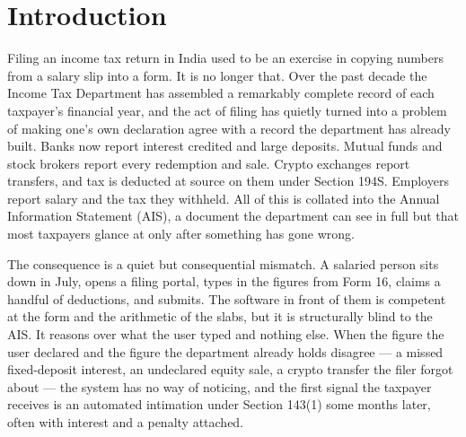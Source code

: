\documentclass[12pt, a4paper, oneside]{report}
\begin{document}
\clearpage
\tableofcontents
\listoffigures
{}
\listoftables
{}

\clearpage
{}
\setcounter{page}{1}



\chapter{Introduction}
\label{chap:introduction}

Filing an income tax return in India used to be an exercise in copying numbers
from a salary slip into a form. It is no longer that. Over the past decade the
Income Tax Department has assembled a remarkably complete record of each
taxpayer's financial year, and the act of filing has quietly turned into a
problem of making one's own declaration agree with a record the department has
already built. Banks now report interest credited and large deposits. Mutual
funds and stock brokers report every redemption and sale. Crypto exchanges
report transfers, and tax is deducted at source on them under Section 194S.
Employers report salary and the tax they withheld. All of this is collated into
the Annual Information Statement (AIS), a document the department can see in
full but that most taxpayers glance at only after something has gone wrong.

The consequence is a quiet but consequential mismatch. A salaried person sits
down in July, opens a filing portal, types in the figures from Form 16, claims
a handful of deductions, and submits. The software in front of them is competent
at the form and the arithmetic of the slabs, but it is structurally blind to the
AIS. It reasons over what the user typed and nothing else. When the figure the
user declared and the figure the department already holds disagree --- a missed
fixed-deposit interest, an undeclared equity sale, a crypto transfer the filer
forgot about --- the system has no way of noticing, and the first signal the
taxpayer receives is an automated intimation under Section 143(1) some months
later, often with interest and a penalty attached.
\end{document}
